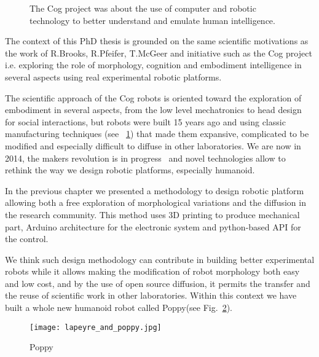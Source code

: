 

\begin{figure}[t]
\centering
    \hfil
    \caption{The Cog project was about the use of computer and robotic technology to better understand and emulate human intelligence.}
    \label{fig:cog_project}
\end{figure}



The context of this PhD thesis is grounded on the same scientific motivations as the work of R.Brooks, R.Pfeifer, T.McGeer and initiative such as the Cog project i.e. exploring the role of morphology, cognition and embodiment intelligence in several aspects using real experimental robotic platforms.

The scientific approach of the Cog robots is oriented toward the exploration of embodiment in several aspects, from the low level mechatronics to head design for social interactions, but robots were built 15 years ago and using classic manufacturing techniques (see \figurename~\ref{fig:cog_project}) that made them expansive, complicated to be modified and especially difficult to diffuse in other laboratories.
We are now in 2014, the makers revolution is in progress~\cite{anderson} and novel technologies allow to rethink the way we design robotic platforms, especially humanoid.

In the previous chapter we presented a methodology to design robotic platform allowing both a free exploration of morphological variations and the diffusion in the research community. This method uses 3D printing to produce mechanical part, Arduino architecture for the electronic system and python-based API for the control.

We think such design methodology can contribute in building better experimental robots while it allows making the modification of robot morphology both easy and low cost, and by the use of open source diffusion, it permits the transfer and the reuse of scientific work in other laboratories.
Within this context we have built a whole new humanoid robot called Poppy\texttrademark (see Fig.~\ref{fig:poppy_with_me}).

\begin{figure}[tb]
    \begin{center}
        \texttt{[image: lapeyre\_and\_poppy.jpg]}
    \end{center}
    \caption{Poppy}
    \label{fig:poppy_with_me}
\end{figure}

